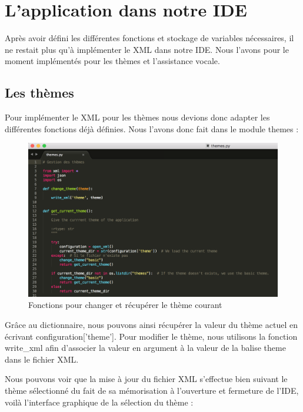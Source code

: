 \documentclass[a4paper,12pt]{article}
\begin{document}
\section{L'application dans notre IDE}

Après avoir défini les différentes fonctions et stockage de variables nécessaires, il ne restait plus qu'à implémenter le XML dans notre IDE. Nous l'avons pour le moment implémentés pour les thèmes et l'assistance vocale.

\subsection{Les thèmes}

Pour implémenter le XML pour les thèmes nous devions donc adapter les différentes fonctions déjà définies. Nous l'avons donc fait dans le module themes : 

\begin{figure}[h!]
			\begin{center}
				\includegraphics[scale=0.45]{images/themes.png}
				\caption{Fonctions pour changer et récupérer le thème courant}
			\end{center}
		\end{figure}

Grâce au dictionnaire, nous pouvons ainsi récupérer la valeur du thème actuel en écrivant configuration['theme']. Pour modifier le thème, nous utilisons la fonction write\_xml afin d'associer la valeur en argument à la valeur de la balise theme dans le fichier XML. 

Nous pouvons voir que la mise à jour du fichier XML s'effectue bien suivant le thème sélectionné du fait de sa mémorisation à l'ouverture et fermeture de l'IDE, voilà l'interface graphique de la sélection du thème : 
\end{document}
